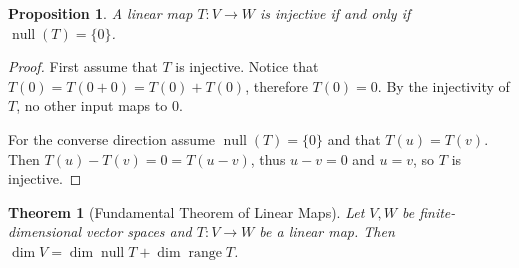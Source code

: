 \documentclass{article}
\newtheorem{theorem}{Theorem}[subsection]
\newtheorem{proposition}{Proposition}[subsection]
\theoremstyle{definition}
\theoremstyle{remark}
\DeclareMathOperator{\Null}{null}
\DeclareMathOperator{\range}{range}
\newcommand{\set}[1]{\{#1\}}
\begin{document}
\begin{proposition}
   A linear map $T : V \to W$ is injective if and only if $\Null(T) = \set{0}$.
\end{proposition}

\begin{proof}
    First assume that $T$ is injective. Notice that $T(0) = T(0 + 0) = T(0) + T(0)$, therefore $T(0) = 0$. By the injectivity of $T$, no other input maps to $0$.
    
    For the converse direction assume $\Null(T) = \set{0}$ and that $T(u) = T(v)$. Then $T(u) - T(v) = 0 = T(u-v)$, thus $u-v = 0$ and $u = v$, so $T$ is injective.
\end{proof}

\begin{theorem} [Fundamental Theorem of Linear Maps]
    Let $V, W$  be finite-dimensional vector spaces and $T: V \to W$ be a linear map. Then $\dim{V} = \dim{\Null T} + \dim{\range T}$.
\end{theorem}
\end{document}
